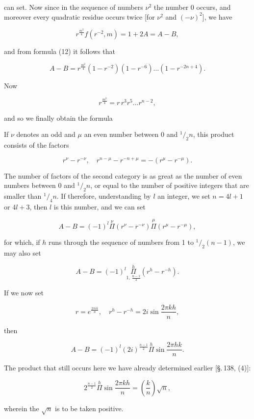 
can set. Now since in the sequence of numbers $\nu^2$ the number 0
occurs, and moreover every quadratic residue occurs twice [for
$\nu^2$ and $(-\nu)^2$], we have

\[ r^{\frac{m^2}{4}} f(r^{-2}, m) = 1 + 2A = A - B, \]

and from formula (12) it follows that

\[ A - B = r^{\frac{m^2}{4}} (1 - r^{-2})(1 - r^{-6}) \ldots (1 - r^{-2n + 4}). \]

Now

\[ r^{\frac{m^2}{4}} = r\, r^3 r^5 \ldots r^{n - 2}, \]

and so we finally obtain the formula


If $\nu$ denotes an odd and $\mu$ an even number between
0 and ${}^1/_2 n$, this product consists of the factors

\[ r^{\nu} - r^{-\nu}, \quad r^{n - \mu} - r^{-n + \mu} = -(r^{\mu} - r^{-\mu}). \]

The number of factors of the second category is as great
as the number of even numbers between 0 and ${}^1/_2 n$, or
equal to the number of positive integers that are smaller than
${}^1/_4 n$. If therefore, understanding by $l$ an integer, we set
$n = 4l + 1$ or $4l + 3$, then $l$ is this number, and
we can set

\[ A - B = (-1)^{l} \overset{\nu}{\Pi} (r^{\nu} - r^{-\nu}) \overset{\mu}{\Pi} (r^{\mu} - r^{-\mu}), \]

for which, if $h$ runs through the sequence of numbers from 1 to ${}^1/_2 (n - 1)$,
we may also set

\[ A - B = (-1)^{l} \overset{h}{\underset{1,\, \frac{n - 1}{2}}{\Pi}} (r^{h} - r^{-h}). \]

If we now set

\[ r = e^{\frac{2 \pi i k}{n}}, \quad r^{h} - r^{-h} = 2i \sin \frac{2 \pi k h}{n}, \]

then

\[ A - B = (-1)^{l} (2i)^{\frac{n - 1}{2}} \overset{h}{\Pi} \sin \frac{2 \pi h k}{n}. \]

The product that still occurs here we have already
determined earlier [\S.\,138, (4)]:

\[ 2^{\frac{n - 1}{2}} \overset{h}{\Pi} \sin \frac{2 \pi k h}{n} = \left( \frac{k}{n} \right) \sqrt{n}, \]

wherein the $\sqrt{n}$ is to be taken positive.
